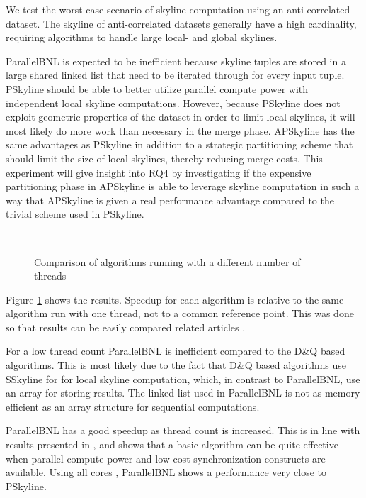 \documentclass[12pt,a4paper,twoside]{report}
\begin{document}
We test the worst-case scenario of skyline computation using an
anti-correlated dataset. The skyline of anti-correlated datasets
generally have a high cardinality, requiring algorithms to handle
large local- and global skylines. 

ParallelBNL is expected to be inefficient because skyline tuples
are stored in a large shared linked list that need to be iterated
through for every input tuple. PSkyline should be able to better
utilize parallel compute power with independent local skyline
computations. However, because PSkyline does not exploit geometric
properties of the dataset in order to limit local skylines, it
will most likely do more work than necessary in the merge phase.
APSkyline has the same advantages as PSkyline in addition to a
strategic partitioning scheme that should limit the size of local
skylines, thereby reducing merge costs. This experiment will give
insight into RQ4 by investigating if the expensive partitioning
phase in APSkyline is able to leverage skyline computation in such
a way that APSkyline is given a real performance advantage
compared to the trivial scheme used in PSkyline.

\begin{figure}[H]
	\centering
		\\
	\caption{Comparison of algorithms running with a different number of threads}
	\label{fig:test-threadcount}
\end{figure}

Figure \ref{fig:test-threadcount} shows the results. Speedup for each
algorithm is relative to the same algorithm run with one thread, not
to a common reference point. This was done so that results can be
easily compared related articles
\cite{park2009parallel,selke2010highly}.

For a low thread count ParallelBNL is inefficient compared to the
D\&Q based algorithms. This is most likely due to the fact that
D\&Q based algorithms use SSkyline for for local skyline
computation, which, in contrast to ParallelBNL, use an array for
storing results. The linked list used in ParallelBNL is not as
memory efficient as an array structure for sequential
computations. 

ParallelBNL has a good speedup as thread count is increased. This is
in line with results presented in \cite{selke2010highly}, and shows
that a basic algorithm can be quite effective when parallel compute
power and low-cost synchronization constructs are available. Using all
cores , ParallelBNL shows a performance very close to PSkyline.
\end{document}
